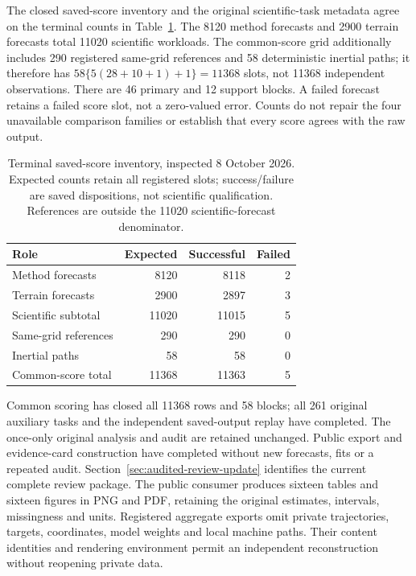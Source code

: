 The closed saved-score inventory and the original scientific-task metadata
agree on the terminal counts in Table~\ref{tab:terminal-score-inventory}.
The 8120 method forecasts and 2900 terrain forecasts total 11020 scientific
workloads. The common-score grid additionally includes 290 registered
same-grid references and 58 deterministic inertial paths; it therefore has
$58\{5(28+10+1)+1\}=11368$ slots, not 11368 independent observations.
There are 46 primary and 12 support blocks. A failed forecast retains a failed
score slot, not a zero-valued error. Counts do not repair the four unavailable
comparison families or establish that every score agrees with the raw output.

\begin{table}[htbp]\centering\small
\caption{Terminal saved-score inventory, inspected 8 October 2026.
Expected counts retain all registered slots; success/failure are saved
dispositions, not scientific qualification. References are outside the
11020 scientific-forecast denominator.}\label{tab:terminal-score-inventory}\hypertarget{tab:terminal-score-inventory}{}
\begin{tabular}{@{}lrrr@{}}\toprule
Role & Expected & Successful & Failed\\\midrule
Method forecasts & 8120 & 8118 & 2\\
Terrain forecasts & 2900 & 2897 & 3\\
Scientific subtotal & 11020 & 11015 & 5\\
Same-grid references & 290 & 290 & 0\\
Inertial paths & 58 & 58 & 0\\
Common-score total & 11368 & 11363 & 5\\
\bottomrule\end{tabular}\end{table}

Common scoring has closed all 11368 rows and 58 blocks; all 261 original
auxiliary tasks and the independent saved-output replay have completed.
The once-only original analysis and audit are retained unchanged. Public
export and evidence-card construction have completed without new forecasts,
fits or a repeated audit. Section~\ref{sec:audited-review-update} identifies
the current complete review package. The public consumer produces sixteen tables
and sixteen figures in PNG and PDF, retaining the original estimates,
intervals, missingness and units. Registered aggregate exports omit private trajectories,
targets, coordinates, model weights and local machine paths. Their content
identities and rendering environment permit an independent reconstruction
without reopening private data.

